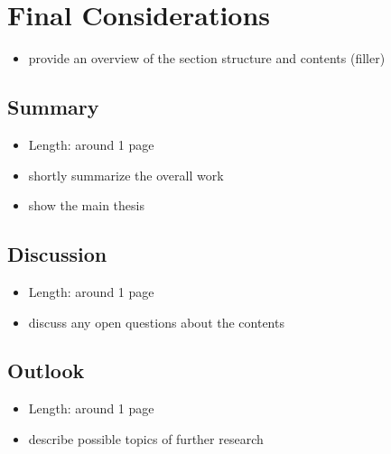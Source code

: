 \section{Final Considerations}

\begin{itemize}
  \item provide an overview of the section structure and contents (filler)
\end{itemize}

\subsection{Summary}

\begin{itemize}
  \item Length: around 1 page
  \item shortly summarize the overall work
  \item show the main thesis
\end{itemize}

\subsection{Discussion}

\begin{itemize}
  \item Length: around 1 page
  \item discuss any open questions about the contents
\end{itemize}

\subsection{Outlook}

\begin{itemize}
  \item Length: around 1 page
  \item describe possible topics of further research
\end{itemize}
